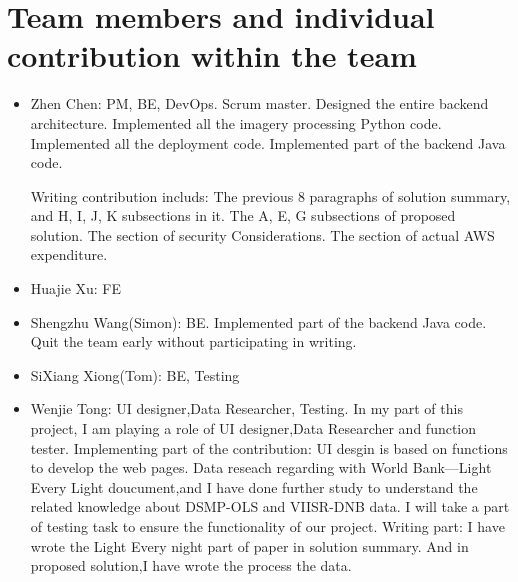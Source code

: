 \documentclass[conference]{IEEEtran}
\begin{document}
\section{Team members and individual contribution within the team}
\begin{itemize}
    \item Zhen Chen: PM, BE, DevOps. Scrum master. Designed the entire backend architecture. Implemented all the imagery processing Python code. Implemented all the deployment code. 
    Implemented part of the backend Java code. 
    
    Writing contribution includs: The previous 8 paragraphs of solution summary, and H, I, J, K subsections in it. The A, E, G subsections of proposed solution. The section of security Considerations. The section of actual AWS expenditure.

    \item Huajie Xu: FE
    \item Shengzhu Wang(Simon): BE. Implemented part of the backend Java code. Quit the team early without participating in writing.
    \item SiXiang Xiong(Tom): BE, Testing
    \item Wenjie Tong: UI designer,Data Researcher, Testing.
    In my part of this project, I am playing a role of UI designer,Data Researcher and function tester. 
    Implementing part of the contribution:
    UI desgin is based on functions to develop the web pages.
    Data reseach regarding with World Bank---Light Every Light doucument,and I have done further study to understand the related knowledge about DSMP-OLS and VIISR-DNB data.
    I will take a part of testing task to ensure the functionality of our project.
    Writing part:
   I have wrote the Light Every night part of paper in solution summary. And in proposed solution,I have wrote the process the data.
    
\end{itemize}
  
\printbibliography
\end{document}
